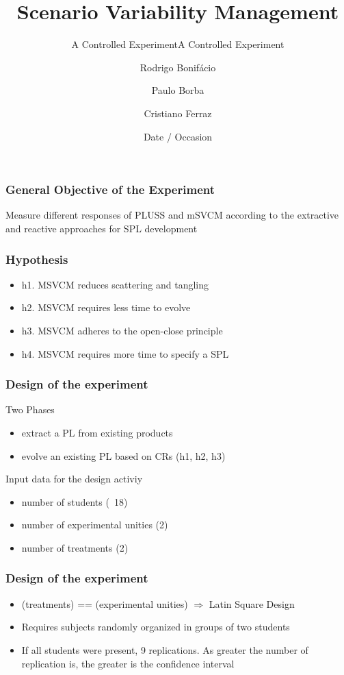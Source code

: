 \documentclass{beamer}
\title{Scenario Variability Management}
\subtitle{A Controlled Experiment}
\subtitle{A Controlled Experiment}
\author{Rodrigo Bonif\'{a}cio\inst{1} \and Paulo Borba\inst{1} \and Cristiano
Ferraz\inst{2}}
\institute[Federal University of Pernambuco]
{
\inst{1}%
Informatics Center
\and
\inst{2}%
Department of Statistics}
\date{Date / Occasion}
\begin{document}
\begin{frame}
\titlepage
\end{frame}

\begin{frame}
\frametitle{General Objective of the Experiment}
Measure different responses of PLUSS and
mSVCM according to the extractive and reactive
approaches for SPL development
\end{frame}

\begin{frame}
\frametitle{Hypothesis}
\begin{itemize}
\item h1. MSVCM reduces scattering and tangling
\item h2. MSVCM requires less time to evolve
\item h3. MSVCM adheres to the open-close principle
\item h4. MSVCM requires more time to specify a SPL
\end{itemize}
\end{frame}

\begin{frame}
\frametitle{Design of the experiment}
\begin{block}{Two Phases}
 \begin{itemize}
  	\item extract a PL from existing products
	\item evolve an existing PL based on CRs (h1, h2, h3)
 \end{itemize}
\end{block}  	
\begin{block}{Input data for the design activiy}
 \begin{itemize}
  	\item number of students (~18)
	\item number of experimental unities (2)
	\item number of treatments (2)
 \end{itemize}
\end{block}  	

\end{frame}

\begin{frame}
\frametitle{Design of the experiment}
\begin{itemize}
 \item (treatments) == (experimental unities) $\Rightarrow$ Latin
 Square Design
 \item Requires subjects randomly organized in groups
 of two students
 \item If all students were present, 9 replications. As
 greater the number of replication is, the greater
 is the confidence interval
\end{itemize}
\end{frame}
\end{document}
